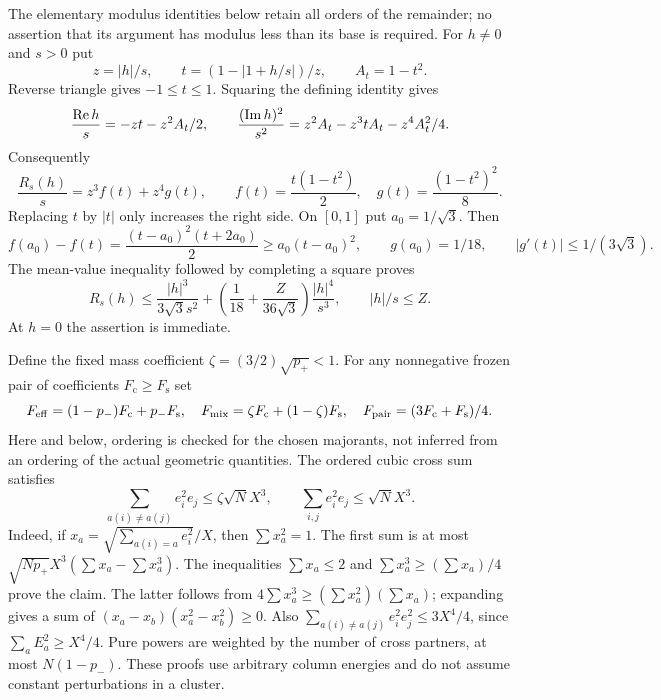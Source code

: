 The elementary modulus identities below retain all orders of the
remainder; no assertion that its argument has modulus less than its
base is required. For $h\ne0$ and $s>0$ put
\[
 z=|h|/s,\qquad t=(1-|1+h/s|)/z,\qquad A_t=1-t^2.
\]
Reverse triangle gives $-1\le t\le1$. Squaring the defining identity
gives
\[
 \frac{\operatorname{Re} h}{s}=-zt-z^2A_t/2,\qquad
 \frac{(\operatorname{Im} h)^2}{s^2}=z^2A_t-z^3tA_t-z^4A_t^2/4.
\]
Consequently
\begin{equation}\label{app:local:scalar-identity}
 \frac{R_s(h)}s=z^3 f(t)+z^4 g(t),\qquad
 f(t)=\frac{t(1-t^2)}2,\quad g(t)=\frac{(1-t^2)^2}8.
\end{equation}
Replacing $t$ by $|t|$ only increases the right side. On $[0,1]$ put
$a_0=1/\sqrt3$. Then
\[
 f(a_0)-f(t)=\frac{(t-a_0)^2(t+2a_0)}2
 \ge a_0(t-a_0)^2,\qquad
 g(a_0)=1/18,\qquad |g'(t)|\le1/(3\sqrt3).
\]
The mean-value inequality followed by completing a square proves
\begin{equation}\label{app:local:unsigned-scalar}
 R_s(h)\le \frac{|h|^3}{3\sqrt3s^2}
       +\left(\frac1{18}+\frac Z{36\sqrt3}\right)\frac{|h|^4}{s^3},
 \qquad |h|/s\le Z.
\end{equation}
At $h=0$ the assertion is immediate.

Define the fixed mass coefficient $\zeta=(3/2)\sqrt{p_+}<1$.
For any nonnegative frozen pair of coefficients
$F_{\mathrm c}\ge F_{\mathrm s}$ set
\begin{equation}\label{app:local:mass-weights}
 F_{\rm eff}=(1-p_-)F_{\mathrm c}+p_-F_{\mathrm s},\quad
 F_{\rm mix}=\zeta F_{\mathrm c}+(1-\zeta)F_{\mathrm s},\quad
 F_{\rm pair}=(3F_{\mathrm c}+F_{\mathrm s})/4 .
\end{equation}
Here and below, ordering is checked for the chosen majorants, not
inferred from an ordering of the actual geometric quantities.
The ordered cubic cross sum satisfies
\[
 \sum_{a(i)\ne a(j)}e_i^2e_j\le\zeta\sqrt N X^3,\qquad
 \sum_{i,j}e_i^2e_j\le\sqrt N X^3.
\]
Indeed, if $x_a=\sqrt{\sum_{a(i)=a}e_i^2}/X$, then $\sum x_a^2=1$.
The first sum is at most
$\sqrt{Np_+}X^3(\sum x_a-\sum x_a^3)$.
The inequalities $\sum x_a\le2$ and
$\sum x_a^3\ge(\sum x_a)/4$ prove the claim. The latter follows from
$4\sum x_a^3\ge(\sum x_a^2)(\sum x_a)$; expanding gives a sum of
$(x_a-x_b)(x_a^2-x_b^2)\ge0$.
Also $\sum_{a(i)\ne a(j)}e_i^2e_j^2\le3X^4/4$, since
$\sum_aE_a^2\ge X^4/4$. Pure powers are weighted by the number of
cross partners, at most $N(1-p_-)$.
These proofs use arbitrary column energies and do not assume
constant perturbations in a cluster.

